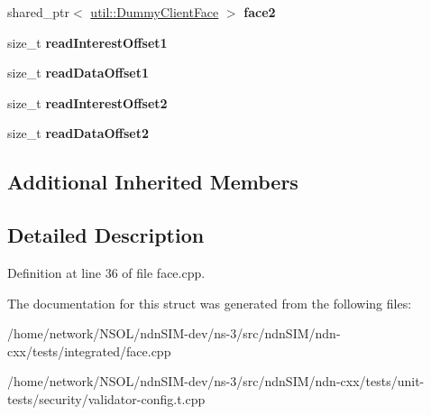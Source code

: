 \begin{DoxyCompactItemize}
\item 
shared\+\_\+ptr$<$ \hyperlink{classndn_1_1util_1_1DummyClientFace}{util\+::\+Dummy\+Client\+Face} $>$ {\bfseries face2}\hypertarget{classndn_1_1tests_1_1FacesFixture_a0327e00205a8a0e0482160faa3839d01}{}\label{classndn_1_1tests_1_1FacesFixture_a0327e00205a8a0e0482160faa3839d01}

\item 
size\+\_\+t {\bfseries read\+Interest\+Offset1}\hypertarget{classndn_1_1tests_1_1FacesFixture_acb1f142dea28e6791b158d7c10033629}{}\label{classndn_1_1tests_1_1FacesFixture_acb1f142dea28e6791b158d7c10033629}

\item 
size\+\_\+t {\bfseries read\+Data\+Offset1}\hypertarget{classndn_1_1tests_1_1FacesFixture_a0daaaa3b830eab1bf75f7656054d4905}{}\label{classndn_1_1tests_1_1FacesFixture_a0daaaa3b830eab1bf75f7656054d4905}

\item 
size\+\_\+t {\bfseries read\+Interest\+Offset2}\hypertarget{classndn_1_1tests_1_1FacesFixture_ace30b7e35feea778058cd42491f6baa1}{}\label{classndn_1_1tests_1_1FacesFixture_ace30b7e35feea778058cd42491f6baa1}

\item 
size\+\_\+t {\bfseries read\+Data\+Offset2}\hypertarget{classndn_1_1tests_1_1FacesFixture_a397dcafe3a34742e5f53697873addb4a}{}\label{classndn_1_1tests_1_1FacesFixture_a397dcafe3a34742e5f53697873addb4a}

\end{DoxyCompactItemize}
\subsection*{Additional Inherited Members}


\subsection{Detailed Description}


Definition at line 36 of file face.\+cpp.



The documentation for this struct was generated from the following files\+:\begin{DoxyCompactItemize}
\item 
/home/network/\+N\+S\+O\+L/ndn\+S\+I\+M-\/dev/ns-\/3/src/ndn\+S\+I\+M/ndn-\/cxx/tests/integrated/face.\+cpp\item 
/home/network/\+N\+S\+O\+L/ndn\+S\+I\+M-\/dev/ns-\/3/src/ndn\+S\+I\+M/ndn-\/cxx/tests/unit-\/tests/security/validator-\/config.\+t.\+cpp\end{DoxyCompactItemize}
